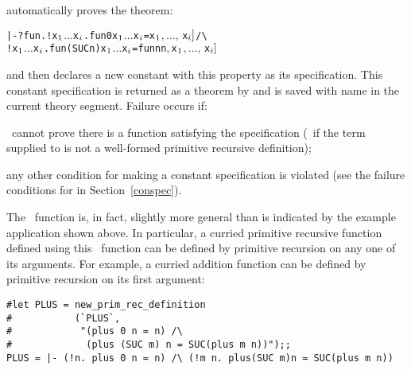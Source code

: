 \noindent automatically proves the theorem:

\begin{hol}\begin{alltt}
   |-  ?fun. !x\(\sb{1}\) \(\dots\) x\(\sb{i}\). fun 0 x\(\sb{1}\) \(\dots\) x\(\sb{i}\) = \m{f\sb{1}[}x\(\sb{1}\)\(,\ldots,\,\)x\(\sb{i}]\) /\verb!\!
             !x\(\sb{1}\) \(\dots\) x\(\sb{i}\). fun (SUC n) x\(\sb{1}\) \(\dots\) x\(\sb{i}\) = \m{f\sb{2}[}fun n  n\(,\) x\(\sb{1}\)\(,\ldots,\,\)x\(\sb{i}]\)
\end{alltt}\end{hol}

\noindent and then declares a new constant  with this property as its
specification. This constant specification is returned as a theorem by
 and is saved with name 
in the current theory segment. Failure occurs if:

\begin{myenumerate}
\item \HOL\ cannot prove there is a function satisfying the specification
(\ie\ if the term supplied to 
 is not a well-formed primitive recursive definition);
\item any other condition for making a constant specification is violated
(see the failure conditions for  in
Section~\ref{conspec}).
\end{myenumerate}

The \ML\  function   is, in  fact, slightly more
general than  is  indicated  by  the  example  application  shown  above.    In
particular, a  curried
primitive  recursive  function defined  using this \ML\
function can be defined  by primitive  recursion on  any one  of its arguments.
For example, a curried  addition function  \ml{plus:num->num->num} can be
defined by primitive recursion on its first argument:

\setcounter{sessioncount}{1}
\begin{session}\begin{verbatim}
#let PLUS = new_prim_rec_definition
#           (`PLUS`,
#            "(plus 0 n = n) /\
#             (plus (SUC m) n = SUC(plus m n))");;
PLUS = |- (!n. plus 0 n = n) /\ (!m n. plus(SUC m)n = SUC(plus m n))
\end{verbatim}\end{session}


